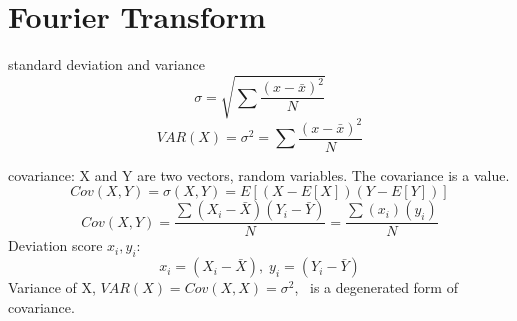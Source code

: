 \section{Fourier Transform}
\begin{compactitem}
 
\item {standard deviation and variance}
\begin{equation}
\label{eq:std}
\sigma = \sqrt {\sum \frac{(x-\bar{x})^2}{N}}
\end{equation}
\begin{equation}
\label{eq:variance}
VAR(X)=\sigma^{2} = {\sum \frac{(x-\bar{x})^2}{N}}
\end{equation}

\item covariance: X and Y are two vectors, random variables. The covariance is a value.
\begin{equation}
\label{eq:covar}
Cov(X,Y)=\sigma(X,Y)=E[(X - E[X])(Y-E[Y])]
\end{equation}
\begin{equation}
\label{eq:covar1}
Cov(X,Y)=\frac{\sum(X_i-\bar{X})(Y_i-\bar{Y})}{N}=
\frac{\sum(x_i)(y_i)}{N}
\end{equation}
Deviation score $x_i, y_i$:
\begin{equation}
\label{eq:covar1}
x_{i}=(X_i-\bar{X}),\;
y_{i}=(Y_i-\bar{Y})
\end{equation}
Variance of X, $VAR(X)=Cov(X,X)=\sigma^{2}$, \ is a degenerated form of covariance.\\


\end{compactitem}
